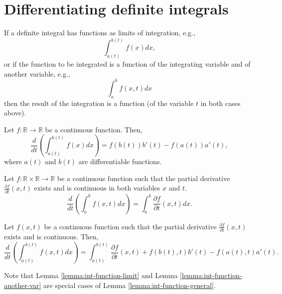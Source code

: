\section{Differentiating definite integrals}
If a definite integral has functions as limits of integration, e.g.,
\begin{equation*}
    \int_{a(t)}^{b(t)} f(x) dx,
\end{equation*}
or if the function to be integrated is a function of the integrating variable and of another variable, e.g.,
\begin{equation*}
    \int_{a}^{b} f(x, t) dx
\end{equation*}
then the result of the integration is a function (of the variable $ t $ in both cases above).

\begin{lemma}\label{lemma:int-function-limit}
    Let $ f : \mathbb{R} \rightarrow \mathbb{R} $ be a continuous function.
    Then,
    \begin{equation}
        \frac{d}{dt} \left( \int_{a(t)}^{b(t)} f(x) dx \right) = f(b(t)) b'(t) - f(a(t)) a'(t),
        \label{eq:lemma:int-function-limit}
    \end{equation}
    where $ a(t) $ and $ b(t) $ are differentiable functions.
\end{lemma}

\begin{lemma}\label{lemma:int-function-another-var}
    Let $ f : \mathbb{R} \times \mathbb{R} \rightarrow \mathbb{R} $ be a continuous function such that the partial derivative $ \frac{\partial f}{\partial t} (x, t) $ exists and is continuous in both variables $ x $ and $ t $.
    \begin{equation}
        \frac{d}{dt} \left( \int_{a}^{b} f(x, t) dx \right) = \int_{a}^{b} \frac{\partial f}{\partial t} (x, t) dx.
        \label{eq:lemma:int-function-another-var}
    \end{equation}
\end{lemma}

\begin{lemma}\label{lemma:int-function-general}
    Let $ f(x, t) $ be a continuous function such that the partial derivative $ \frac{\partial f}{\partial t} (x, t) $ exists and is continuous.
    Then,
    \begin{equation*}
        \frac{d}{dt} \left( \int_{a(t)}^{b(t)} f(x, t) dx \right) = \int_{a(t)}^{b(t)} \frac{\partial f}{\partial t} (x, t) + f(b(t), t) b'(t) - f(a(t), t) a'(t).
    \end{equation*}
\end{lemma}
Note that Lemma \ref{lemma:int-function-limit} and Lemma \ref{lemma:int-function-another-var} are special cases of Lemma \ref{lemma:int-function-general}.

